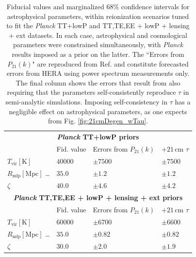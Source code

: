 \documentclass[twocolumn,aps,prd,nofootinbib,showpacs,superscriptaddress]{revtex4-1}
\begin{document}
\begin{table}
\caption{\label{tab:AstroParams} Fiducial values and marginalized $68\%$ confidence intervals for astrophysical parameters, within reionization scenarios tuned to fit the \emph{Planck} TT+lowP and TT,TE,EE + lowP + lensing + ext datasets. In each case, astrophysical and cosmological parameters were constrained simultaneously, with \emph{Planck} results imposed as a prior on the latter. The ``Errors from $P_{21}(k)$" are reproduced from Ref. \cite{Liu_in_prep} and constitute forecasted errors from HERA using power spectrum measurements only. The final column shows the errors that result from also requiring that the parameters self-consistently reproduce $\tau$ in semi-analytic simulations. Imposing self-consistency in $\tau$ has a negligible effect on astrophysical parameters, as one expects from Fig. \ref{fig:21cmDegen_wTau}.}
\begin{ruledtabular}
\begin{tabular}{llll}
\multicolumn{4}{c}{   \textbf{\emph{Planck} TT+lowP priors} }  \\
& Fid. value & Errors from  $P_{21} (k)$ & $+21\,\textrm{cm}$ $\tau$\\
\hline
$T_\textrm{vir}\left[ \textrm{K} \right]$  \dotfill & $40000$ & $\pm 7500$ & $\pm 7500$ \\
 $R_\textrm{mfp}\left[ \textrm{Mpc} \right]$ \dots \dotfill & $35.0$ & $\pm1.2$ & $\pm1.2$ \\
$\zeta$ \dotfill& $40.0$ & $\pm 4.6$ & $\pm 4.2$ \\
\hline 
\multicolumn{4}{c}{    \textbf{\emph{Planck} TT,TE,EE + lowP + lensing + ext priors} }  \\
& Fid. value & Errors from  $P_{21} (k)$  & $+21\,\textrm{cm}$ $\tau$\\
\hline
$T_\textrm{vir}\left[ \textrm{K} \right]$  \dotfill & $60000$ & $\pm 6700$ & $\pm 6600$ \\
$R_\textrm{mfp}\left[ \textrm{Mpc} \right]$ \dots \dotfill & $35.0$ & $\pm 0.82$ & $\pm 0.82$ \\
$\zeta$ \dotfill& $30.0$ & $\pm 2.0$ & $\pm 1.9$\\
\end{tabular}
\end{ruledtabular}
\end{table}
\end{document}
